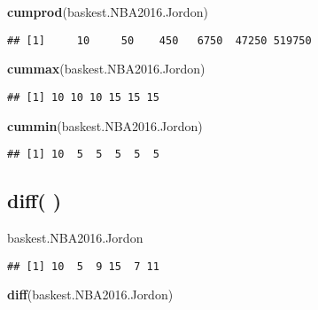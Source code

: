 \documentclass[]{article}
\newenvironment{Shaded}{\begin{snugshade}}{\end{snugshade}}
\newcommand{\KeywordTok}[1]{\textcolor[rgb]{0.13,0.29,0.53}{\textbf{#1}}}
\newcommand{\NormalTok}[1]{#1}
\begin{document}
\begin{Shaded}
\begin{Highlighting}[]
\KeywordTok{cumprod}\NormalTok{(baskest.NBA2016.Jordon)}
\end{Highlighting}
\end{Shaded}

\begin{verbatim}
## [1]     10     50    450   6750  47250 519750
\end{verbatim}

\begin{Shaded}
\begin{Highlighting}[]
\KeywordTok{cummax}\NormalTok{(baskest.NBA2016.Jordon)}
\end{Highlighting}
\end{Shaded}

\begin{verbatim}
## [1] 10 10 10 15 15 15
\end{verbatim}

\begin{Shaded}
\begin{Highlighting}[]
\KeywordTok{cummin}\NormalTok{(baskest.NBA2016.Jordon)}
\end{Highlighting}
\end{Shaded}

\begin{verbatim}
## [1] 10  5  5  5  5  5
\end{verbatim}

\hypertarget{diff}{%
\subsection{diff( )}\label{diff}}

\begin{Shaded}
\begin{Highlighting}[]
\NormalTok{baskest.NBA2016.Jordon}
\end{Highlighting}
\end{Shaded}

\begin{verbatim}
## [1] 10  5  9 15  7 11
\end{verbatim}

\begin{Shaded}
\begin{Highlighting}[]
\KeywordTok{diff}\NormalTok{(baskest.NBA2016.Jordon)}
\end{Highlighting}
\end{Shaded}
\end{document}
